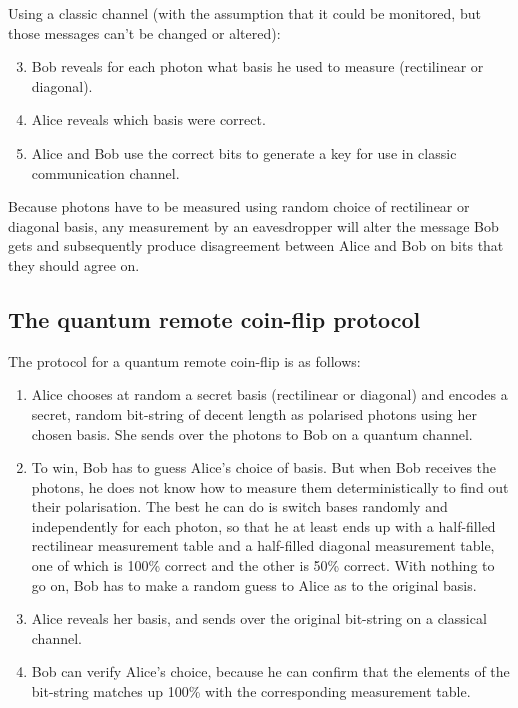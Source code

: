 \documentclass[oneside,a4paper]{article}
\begin{document}
Using a classic channel (with the assumption that it could be monitored, but those messages can't be changed or altered):

\begin{enumerate}
    \setcounter{enumi}{2}
    \item Bob reveals for each photon what basis he used to measure (rectilinear or diagonal).
    \item Alice reveals which basis were correct.
    \item Alice and Bob use the correct bits to generate a key for use in classic communication channel.
\end{enumerate}

Because photons have to be measured using random choice of rectilinear or diagonal basis, any measurement by an eavesdropper will alter the message Bob gets and subsequently produce disagreement between Alice and Bob on bits that they should agree on.

\subsection{The quantum remote coin-flip protocol}
The protocol for a quantum remote coin-flip is as follows:
\begin{enumerate}
	\item
		Alice chooses at random a secret basis (rectilinear or diagonal) and encodes a secret, random bit-string of decent length as polarised photons using her chosen basis.
		She sends over the photons to Bob on a quantum channel.
	\item
		To win, Bob has to guess Alice's choice of basis.
		But when Bob receives the photons, he does not know how to measure them deterministically to find out their polarisation.
		The best he can do is switch bases randomly and independently for each photon, so that he at least ends up with a half-filled rectilinear measurement table and a half-filled diagonal measurement table, one of which is 100\% correct and the other is 50\% correct.
		With nothing to go on, Bob has to make a random guess to Alice as to the original basis.
	\item Alice reveals her basis, and sends over the original bit-string on a classical channel.
	\item Bob can verify Alice's choice, because he can confirm that the elements of the bit-string matches up 100\% with the corresponding measurement table.
\end{enumerate}
\end{document}
